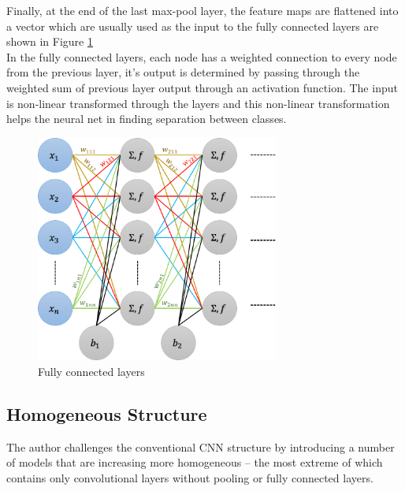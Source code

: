 Finally, at the end of the last max-pool layer, the feature maps are flattened into a vector which are usually used as the input to the fully connected layers are shown in Figure \ref{fig:fullyconnected}\\
In the fully connected layers, each node has a weighted connection to every node from the previous layer, it's output is determined by passing through the weighted sum of previous layer output through an activation function. The input is non-linear transformed through the layers and this non-linear transformation helps the neural net in finding separation between classes.\\
\begin{figure}[hb]
	\includegraphics[width = 8cm]{img/fullyconnected.png}
    \caption{\label{fig:fullyconnected}
    Fully connected layers}
\end{figure}

\subsection{Homogeneous Structure}
The author challenges the conventional CNN structure by introducing a number of models that are increasing more homogeneous -- the most extreme of which contains only convolutional layers without pooling or fully connected layers.